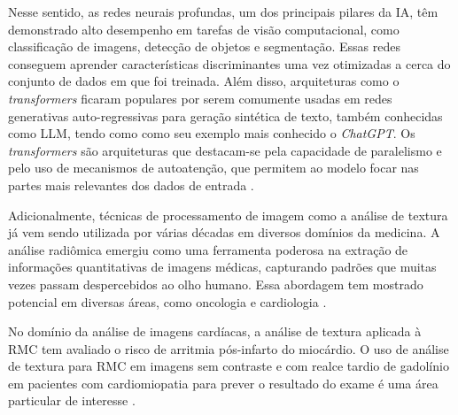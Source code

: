 Nesse sentido, as redes neurais profundas, um dos principais pilares da \gls{IA}, têm demonstrado alto desempenho em tarefas de visão computacional, como classificação de imagens, detecção de objetos e segmentação. Essas redes conseguem aprender características discriminantes uma vez otimizadas a cerca do conjunto de dados em que foi treinada. Além disso, arquiteturas como o \textit{transformers} ficaram populares por serem comumente usadas em redes generativas auto-regressivas para geração sintética de texto, também conhecidas como \gls{LLM}, tendo como como seu exemplo mais conhecido o \textit{ChatGPT}. Os \textit{transformers} são arquiteturas que destacam-se pela capacidade de paralelismo e pelo uso de mecanismos de autoatenção, que permitem ao modelo focar nas partes mais relevantes dos dados de entrada \cite{russell2020artificial}.

Adicionalmente, técnicas de processamento de imagem como a análise de textura já vem sendo utilizada por várias décadas em diversos domínios da medicina. A análise radiômica emergiu como uma ferramenta poderosa na extração de informações quantitativas de imagens médicas, capturando padrões que muitas vezes passam despercebidos ao olho humano. Essa abordagem tem mostrado potencial em diversas áreas, como oncologia e cardiologia \cite{schofieldTextureAnalysisCardiovascular2019a}.



No domínio da análise de imagens cardíacas, a análise de textura aplicada à \gls{RMC} tem avaliado o risco de arritmia pós-infarto do miocárdio. O uso de análise de textura para \gls{RMC} em imagens sem contraste e com realce tardio de gadolínio em pacientes com cardiomiopatia para prever o resultado do exame é uma área particular de interesse \cite{schofieldTextureAnalysisCardiovascular2019a}.

